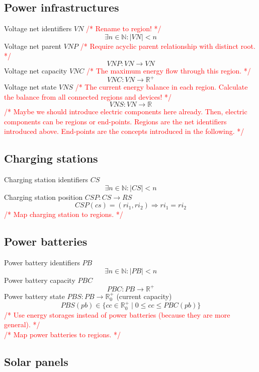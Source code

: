 \documentclass[conference]{IEEEtran}
\newcommand{\todo}[1]{\textcolor{red}{/* #1 */}}
\begin{document}
	\subsection{Power infrastructures}
	\label{power}
	
	Voltage net identifiers $VN$ \todo{Rename to region!}
	\[
		\exists n \in \mathbb{N} : |VN| < n
	\]
	Voltage net parent $VNP$ \todo{Require acyclic parent relationship with distinct root.}
	\[
		VNP : VN \rightarrow VN
	\]
	Voltage net capacity $VNC$ \todo{The maximum energy flow through this region.}
	\[
		VNC : VN \rightarrow \mathbb{R}^+
	\]
	Voltage net state $VNS$ \todo{The current energy balance in each region. Calculate the balance from all connected regions and devices!}
	\[
		VNS : VN \rightarrow \mathbb{R}
	\]
	\todo{Maybe we should introduce electric components here already. Then, electric components can be regions or end-points. Regions are the net identifiers introduced above. End-points are the concepts introduced in the following.}
	
	\subsection{Charging stations}
	\label{charging_stations}
		
	Charging station identifiers $CS$
	\[
		\exists n \in \mathbb{N} : |CS| < n
	\]
	Charging station position $CSP : CS \rightarrow RS$
	\[
		CSP(cs) = (ri_1, ri_2) \Rightarrow ri_1 = ri_2
	\]
	\todo{Map charging station to regions.}
		
	\subsection{Power batteries}
	\label{power_batteries}
	
	Power battery identifiers $PB$	
	\[
		\exists n \in \mathbb{N} : |PB| < n
	\]
	Power battery capacity $PBC$
	\[
		PBC : PB \rightarrow \mathbb{R}^+
	\]
	Power battery state $PBS : PB \rightarrow \mathbb{R}_0^+$ (current capacity)
	\[
		PBS(pb) \in \{ cc \in \mathbb{R}_0^+ \mid 0 \leq cc \leq PBC(pb) \}
	\]
	\todo{Use energy storages instead of power batteries (because they are more general).}
	\\
	\todo{Map power batteries to regions.}
	
	\subsection{Solar panels}
	\label{solar_panels}
	
\end{document}
